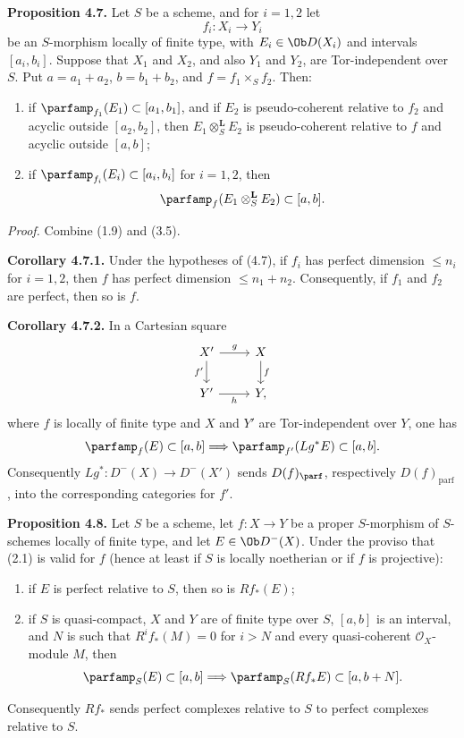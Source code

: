 \documentclass[11pt]{article}
\begin{document}
\textbf{Proposition 4.7.} Let \(S\) be a scheme, and for \(i=1,2\) let
\[
 f_i:X_i\longrightarrow Y_i
\]
be an \(S\)-morphism locally of finite type, with \(E_i\in\Ob D(X_i)\) and intervals \([a_i,b_i]\). Suppose that \(X_1\) and \(X_2\), and also \(Y_1\) and \(Y_2\), are Tor-independent over \(S\). Put \(a=a_1+a_2\), \(b=b_1+b_2\), and \(f=f_1\times_S f_2\). Then:
\begin{enumerate}[label=\alph*)]
\item if \(\parfamp_{f_1}(E_1)\subset[a_1,b_1]\), and if \(E_2\) is pseudo-coherent relative to \(f_2\) and acyclic outside \([a_2,b_2]\), then \(E_1\otimes_S^{\mathbf L}E_2\) is pseudo-coherent relative to \(f\) and acyclic outside \([a,b]\);
\item if \(\parfamp_{f_i}(E_i)\subset[a_i,b_i]\) for \(i=1,2\), then
\[
 \parfamp_f(E_1\otimes_S^{\mathbf L}E_2)
 \subset[a,b].
\]
\end{enumerate}

\emph{Proof.} Combine (1.9) and (3.5).

\textbf{Corollary 4.7.1.} Under the hypotheses of (4.7), if \(f_i\) has perfect dimension \(\leq n_i\) for \(i=1,2\), then \(f\) has perfect dimension \(\leq n_1+n_2\). Consequently, if \(f_1\) and \(f_2\) are perfect, then so is \(f\).

\textbf{Corollary 4.7.2.} In a Cartesian square
\[
\begin{tikzcd}
X' \arrow[r,"g"] \arrow[d,"f'"'] & X \arrow[d,"f"]\\
Y' \arrow[r,"h"'] & Y,
\end{tikzcd}
\]
where \(f\) is locally of finite type and \(X\) and \(Y'\) are Tor-independent over \(Y\), one has
\[
 \parfamp_f(E)
 \subset[a,b]
 \Longrightarrow
 \parfamp_{f'}(Lg^*E)
 \subset[a,b].
\]
Consequently \(Lg^*:D^{-}(X)\to D^{-}(X')\) sends \(D(f)_{\parf}\), respectively \(D(f)_{\mathrm{parf}}\), into the corresponding categories for \(f'\).

\textbf{Proposition 4.8.} Let \(S\) be a scheme, let \(f:X\to Y\) be a proper \(S\)-morphism of \(S\)-schemes locally of finite type, and let \(E\in\Ob D^{-}(X)\). Under the proviso that (2.1) is valid for \(f\) (hence at least if \(S\) is locally noetherian or if \(f\) is projective):
\begin{enumerate}[label=\alph*)]
\item if \(E\) is perfect relative to \(S\), then so is \(Rf_*(E)\);
\item if \(S\) is quasi-compact, \(X\) and \(Y\) are of finite type over \(S\), \([a,b]\) is an interval, and \(N\) is such that \(R^if_*(M)=0\) for \(i>N\) and every quasi-coherent \(\mathcal O_X\)-module \(M\), then
\[
 \parfamp_S(E)\subset[a,b]
 \Longrightarrow
 \parfamp_S(Rf_*E)
 \subset[a,b+N].
\]
\end{enumerate}
Consequently \(Rf_*\) sends perfect complexes relative to \(S\) to perfect complexes relative to \(S\).
\end{document}
